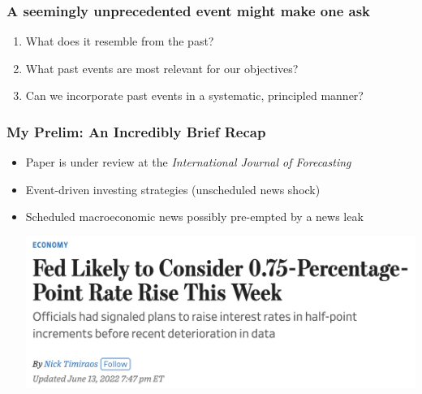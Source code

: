 \documentclass[9pt]{beamer}
\theoremstyle{definition}
\begin{document}
\begin{frame}
\frametitle{A seemingly unprecedented event might make one ask}
\begin{enumerate}
    \item <1-> What does it resemble from the past?
    \item <2-> What past events are most relevant for our objectives?
    \item <3-> Can we incorporate past events in a systematic, principled manner?
\end{enumerate}
\end{frame}

\begin{frame}
    \frametitle{My Prelim: An Incredibly Brief Recap}

    \begin{itemize}
        \item <1-> Paper is under review at the \textit{International Journal of Forecasting}
        \item <2-> Event-driven investing strategies (unscheduled news shock)
        \item <3-> Scheduled macroeconomic news possibly pre-empted by a news leak

        \href{https://www.wsj.com/articles/bad-inflation-reports-raise-odds-of-surprise-0-75-percentage-point-rate-rise-this-week-11655147927}{\includegraphics[scale=.3]{WSJ_rate_hike_2022.png}}
    \end{itemize}
\end{frame}
\end{document}
